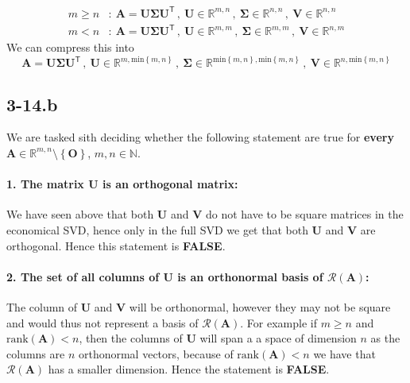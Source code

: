 \documentclass{article}
\begin{document}
\begin{align*}
    m \geq n&: \: \mathbf{A} = \mathbf{U}\mathbf{\Sigma}\mathbf{U}^{\mathsf{T}}\,,\: \mathbf{U}\in \mathbb{R}^{m,n}\,,\:\mathbf{\Sigma}\in\mathbb{R}^{n,n}\,,\: \mathbf{V}\in\mathbb{R}^{n,n} \\
     m < n&: \:
    \mathbf{A} = \mathbf{U}\mathbf{\Sigma}\mathbf{U}^{\mathsf{T}}\,,\: \mathbf{U}\in \mathbb{R}^{m,m}\,,\:\mathbf{\Sigma}\in\mathbb{R}^{m,m}\,,\: \mathbf{V}\in\mathbb{R}^{n,m}
\end{align*}
We can compress this into 
\begin{equation*}
    \mathbf{A} = \mathbf{U}\mathbf{\Sigma}\mathbf{U}^{\mathsf{T}}\,,\: \mathbf{U}\in \mathbb{R}^{m,\text{min}\left\{m,n\right\}}\,,\:\mathbf{\Sigma}\in\mathbb{R}^{\text{min}\left\{m,n\right\},\text{min}\left\{m,n\right\}}\,,\: \mathbf{V}\in\mathbb{R}^{n,\text{min}\left\{m,n\right\}}
\end{equation*}

\pagebreak

\subsection*{3-14.b}
We are tasked sith deciding whether the following statement are true for \textbf{every} $\mathbf{A}\in \mathbb{R}^{m,n} \setminus \left\{\mathbf{O}\right\}$, $m,n\in \mathbb{N}$.
\paragraph{1. The matrix $\mathbf{U}$ is an orthogonal matrix:} We have seen above that both $\mathbf{U}$ and $\mathbf{V}$ do not have to be square matrices in the economical SVD, hence only in the full SVD we get that both $\mathbf{U}$ and $\mathbf{V}$ are orthogonal. Hence this statement is \textbf{FALSE}.
\paragraph{2. The set of all columns of $\mathbf{U}$ is an orthonormal basis of $\mathcal{R}\left(\mathbf{A}\right)$:} The column of $\mathbf{U}$ and $\mathbf{V}$ will be orthonormal, however they may not be square and would thus not represent a basis of $\mathcal{R}\left(\mathbf{A}\right)$. For example if $m \geq n$ and $\text{rank}\left(\mathbf{A}\right) < n$, then the columns of $\mathbf{U}$ will span a a space of dimension $n$ as the columns are $n$ orthonormal vectors, because of $\text{rank}\left(\mathbf{A}\right) < n$ we have that $\mathcal{R}\left(\mathbf{A}\right)$ has a smaller dimension. Hence the statement is \textbf{FALSE}.
\end{document}
